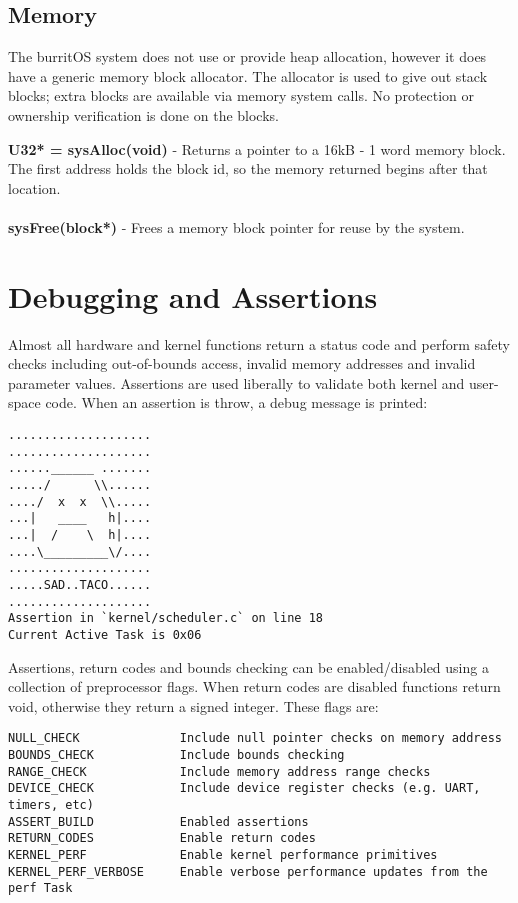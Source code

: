 \documentclass[twoside,a4paper]{refart}
\begin{document}
\subsection{Memory}

The burritOS system does not use or provide heap allocation, however it does have a generic memory block allocator. The allocator is used to give out stack blocks; extra blocks are available via memory system calls. No protection or ownership verification is done on the blocks.

\textbf{U32* = sysAlloc(void)} - Returns a pointer to a 16kB - 1 word memory block. The first address holds the block id, so the memory returned begins after that location.\\\\
\textbf{sysFree(block*)} - Frees a memory block pointer for reuse by the system. 

\section{Debugging and Assertions}
 Almost all hardware and kernel functions return a status code and perform safety checks including out-of-bounds access, invalid memory addresses and invalid parameter values. Assertions are used liberally to validate both kernel and user-space code. When an assertion is throw, a debug message is printed:

\begin{verbatim}
....................
....................
......______ .......
...../      \\......
..../  x  x  \\.....
...|   ____   h|....
...|  /    \  h|....
....\_________\/....
....................
.....SAD..TACO......
....................
Assertion in `kernel/scheduler.c` on line 18
Current Active Task is 0x06
\end{verbatim}

Assertions, return codes and bounds checking can be enabled/disabled using a collection of preprocessor flags. When return codes are disabled functions return void, otherwise they return a signed integer. These flags are:\\
\begin{verbatim}
NULL_CHECK              Include null pointer checks on memory address
BOUNDS_CHECK            Include bounds checking
RANGE_CHECK             Include memory address range checks
DEVICE_CHECK            Include device register checks (e.g. UART, timers, etc)
ASSERT_BUILD            Enabled assertions
RETURN_CODES            Enable return codes
KERNEL_PERF             Enable kernel performance primitives
KERNEL_PERF_VERBOSE     Enable verbose performance updates from the perf Task
\end{verbatim}
\end{document}
